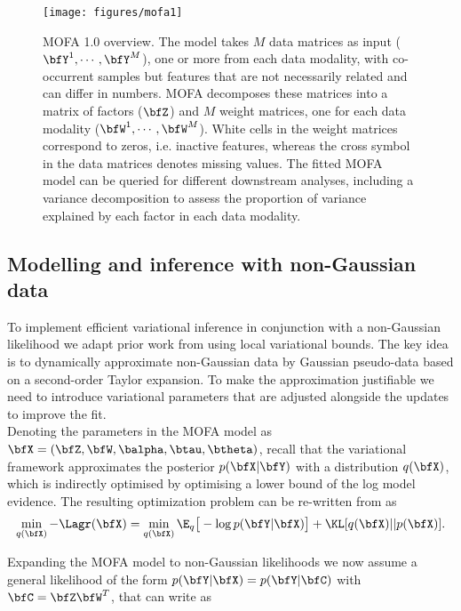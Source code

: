 \begin{figure}[H]
	\begin{center}
		\texttt{[image: figures/mofa1]}
		\caption{MOFA 1.0 overview. The model takes $M$ data matrices as input ($\bfY^1, \cdots, \bfY^M$), one or more from each data modality, with co-occurrent samples but features that are not necessarily related and can differ in numbers. MOFA decomposes these matrices into a matrix of factors ($\bfZ$) and $M$ weight matrices, one for each data modality ($\bfW^1, \cdots, \bfW^M$). White cells in the weight matrices correspond to zeros, i.e. inactive features, whereas the cross symbol in the data matrices denotes missing values. The fitted MOFA model can be queried for different downstream analyses, including a variance decomposition to assess the proportion of variance explained by each factor in each data modality.}
		\label{fig:MOFA1}
	\end{center}
\end{figure}

\subsection{Modelling and inference with non-Gaussian data} \label{section:non_gaussian}
To implement efficient variational inference in conjunction with a non-Gaussian likelihood we adapt prior work from \cite{seeger} using local variational bounds. The key idea is to dynamically approximate non-Gaussian data by Gaussian pseudo-data based on a second-order Taylor expansion.  To make the approximation justifiable we need to introduce variational parameters that are adjusted alongside the updates to improve the fit.	\\
Denoting the parameters in the MOFA model as $\bfX= (\bfZ,\bfW,\balpha,\btau,\btheta)$, recall that the variational framework approximates the posterior $p(\bfX | \bfY )$ with a distribution $q(\bfX)$, which is indirectly optimised by optimising a lower bound of the log model evidence. The resulting optimization problem can be re-written from  as
\begin{equation*}
\min_{q(\bfX)} -\Lagr(\bfX) =  \min_{q(\bfX)} \E_q \big[ -\log p(\bfY|\bfX) \big] + \KL[q(\bfX)||p(\bfX)].
\end{equation*}


Expanding the MOFA model to non-Gaussian likelihoods we now assume a general likelihood of the form $p(\bfY|\bfX)=p(\bfY|\bfC)$ with $\bfC = \bfZ\bfW^{T}$, that can write as

